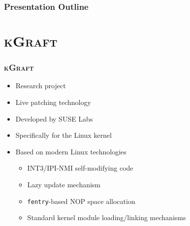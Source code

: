 \documentclass[xcolor=dvipsnames,handout]{beamer}
\newcommand\kgr{\textsc{kGraft}\xspace}
\newcommand{\code}[2][]{\lstinline[columns=fullflexible, basicstyle=\ttfamily,
	#1]$#2$}
\begin{document}
\begin{frame}
  \frametitle{Presentation Outline}

  \tableofcontents

\end{frame}

\section{\kgr}
\frame{\sectionpage}

\begin{frame}
  \frametitle{\kgr}

  \begin{itemize}
    \item Research project
    \item Live patching technology
    \item Developed by SUSE Labs
    \item Specifically for the Linux kernel

    \pause

    \item Based on modern Linux technologies
    \begin{itemize}
      \item INT3/IPI-NMI self-modifying code
      \item Lazy update mechanism
      \item \code{fentry}-based NOP space allocation
      \item Standard kernel module loading/linking mechanisms
    \end{itemize}

  \end{itemize}

\end{frame}
\end{document}
